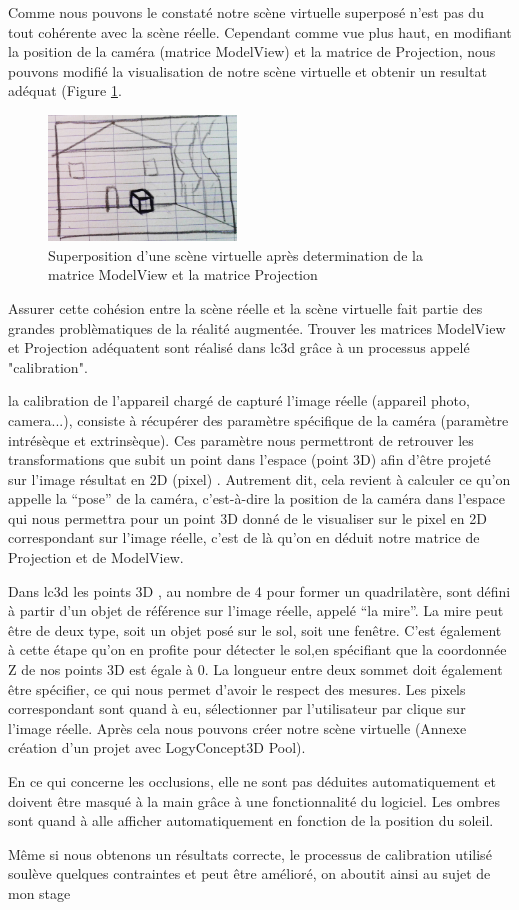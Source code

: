 Comme nous pouvons le constaté notre scène virtuelle superposé n’est pas du tout cohérente avec la scène réelle. Cependant comme vue plus haut, en modifiant la position de la caméra (matrice ModelView) et la matrice de Projection, nous pouvons modifié la visualisation de notre scène virtuelle et obtenir un resultat adéquat (Figure \ref{fig:schemaRV2}.

\begin{figure}[!ht]
\centering
\includegraphics[width = 5cm] {images/croquisRAModelViewAfter.jpg}
\caption{Superposition d'une scène virtuelle après determination de la matrice ModelView et la matrice Projection}
\label{fig:schemaRV2}
\end{figure}

Assurer cette cohésion entre la scène réelle et la scène virtuelle fait partie des grandes problèmatiques de la réalité augmentée. Trouver les matrices ModelView et Projection adéquatent sont réalisé dans \gls{lc3d} grâce à un processus appelé "\gls{calibration}".

la calibration de l'appareil chargé de capturé l'image réelle (appareil photo, camera...), consiste à récupérer des paramètre spécifique de la caméra (paramètre intrésèque et extrinsèque). Ces paramètre nous permettront de retrouver les transformations que subit un point dans l’espace (point 3D) afin d’être projeté sur l’image résultat en 2D (pixel) . Autrement dit, cela revient à calculer ce qu’on appelle la “pose” de la caméra, c’est-à-dire la position de la caméra dans l’espace qui nous permettra pour un point 3D donné de le visualiser sur le pixel en 2D correspondant sur l’image réelle, c’est de là qu’on en déduit notre matrice de Projection et de ModelView. 

Dans \gls{lc3d} les points 3D , au nombre de 4 pour former un quadrilatère, sont défini à partir d’un objet de référence sur l’image réelle, appelé “la mire”. La mire peut être de deux type, soit un objet posé sur le sol, soit une fenêtre. C’est également à cette étape qu’on en profite pour détecter le sol,en spécifiant que la coordonnée  Z de nos points 3D est égale à 0. La longueur entre deux sommet doit également être spécifier, ce qui nous permet d’avoir le respect des mesures. Les pixels correspondant sont quand à eu, sélectionner par l’utilisateur par clique sur l’image réelle. Après cela nous pouvons créer notre scène virtuelle (Annexe création d’un projet avec LogyConcept3D Pool).

En ce qui concerne les occlusions, elle ne sont pas déduites automatiquement et doivent être masqué à la main grâce à une fonctionnalité du logiciel.
Les ombres sont quand à alle afficher automatiquement en fonction de la position du soleil. 

Même si nous obtenons un résultats correcte, le processus de calibration utilisé soulève quelques contraintes et peut être amélioré, on aboutit ainsi au sujet de mon stage
